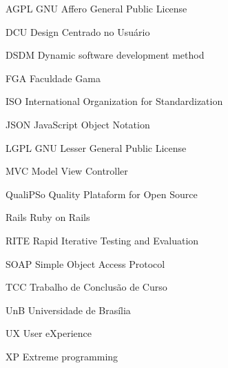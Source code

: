 \begin{siglas}
	\item[AGPL] GNU Affero General Public License
	\item[DCU] Design Centrado no Usuário
  	\item[DSDM] Dynamic software development method  
	\item[FGA] Faculdade Gama  
	\item[ISO] International Organization for Standardization  
	\item[JSON] JavaScript Object Notation
	\item[LGPL] GNU Lesser General Public License
	\item[MVC] Model View Controller
	\item[QualiPSo] Quality Plataform for Open Source
	\item[Rails] Ruby on Rails	
	\item[RITE] Rapid Iterative Testing and Evaluation
	\item[SOAP] Simple Object Access Protocol	
	\item[TCC] Trabalho de Conclusão de Curso					  
	\item[UnB] Universidade de Brasília
	\item[UX] User eXperience
	\item[XP] Extreme programming  
\end{siglas}
